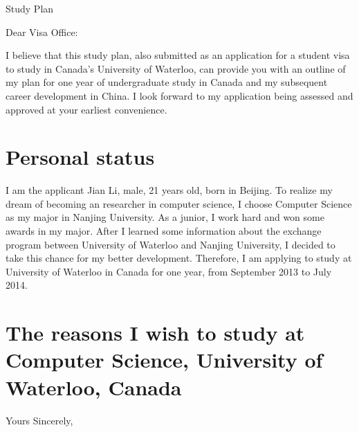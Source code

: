 \documentclass{letter}
\date{}
\begin{document}
 
\begin{letter}{Study Plan}%


\opening{Dear Visa Office:}
 
I believe that this study plan, also submitted as an application for a student visa to study in Canada’s University of Waterloo, can provide you with an outline of my plan for one year of undergraduate study in Canada and my subsequent career development in China. I look forward to my application being assessed and approved at your earliest convenience.
 

\section{Personal status}

I am the applicant Jian Li, male, 21 years old, born in Beijing. To realize my dream of becoming an researcher in computer science, I choose Computer Science as my major in Nanjing University. As a junior, I work hard and won some awards in my major. After I learned some information about the exchange program between University of Waterloo and Nanjing University, I decided to take this chance for my better development. Therefore, I am applying to study at University of Waterloo in Canada for one year, from September 2013 to July 2014. 

\section{The reasons I wish to study at Computer Science, University of Waterloo, Canada}

\closing{Yours Sincerely,}
 
 
\end{letter}
 
\end{document}
